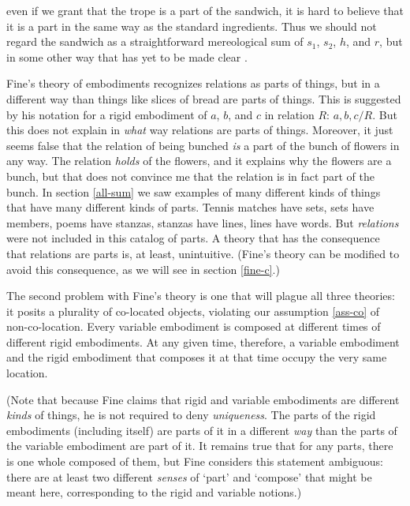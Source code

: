 \documentclass[11pt]{article}
\newenvironment{squote}{%
\begin{spacing}{1}
\begin{list}{}{%
\setlength{\labelwidth}{0pt}%
\rightmargin\leftmargin%
}
\item\relax
}{%
\end{list}%
\end{spacing}
}
\begin{document}
\begin{spacing}{1.5}
\begin{squote}
even if we grant that the trope is a part of the sandwich, it is hard
to believe that it is a part in the same way as the standard
ingredients.  Thus we should not regard the sandwich as a
straightforward mereological sum of $s_1$, $s_2$, $h$, and $r$, but in
some other way that has yet to be made clear \citep[64]{fine1999}.
\end{squote}

Fine's theory of embodiments recognizes relations as parts of things,
but in a different way than things like slices of bread are parts of
things.  This is suggested by his notation for a rigid embodiment of
$a$, $b$, and $c$ in relation $R$: $a, b, c / R$.  But this does not
explain in {\em what} way relations are parts of things.  Moreover, it
just seems false that the relation of being bunched {\em is} a part of
the bunch of flowers in any way.  The relation {\em holds} of the
flowers, and it explains why the flowers are a bunch, but that does
not convince me that the relation is in fact part of the bunch.  In
section \ref{all-sum} we saw examples of many different kinds of
things that have many different kinds of parts.  Tennis matches have
sets, sets have members, poems have stanzas, stanzas have lines, lines
have words.  But {\em relations} were not included in this catalog of
parts.  A theory that has the consequence that relations are parts is,
at least, unintuitive.  (Fine's theory can be modified to avoid this
consequence, as we will see in section \ref{fine-c}.)

The second problem with Fine's theory is one that will plague all
three theories: it posits a plurality of co-located objects, violating
our assumption \ref{ass-co} of non-co-location.  Every variable
embodiment is composed at different times of different rigid
embodiments.  At any given time, therefore, a variable embodiment and
the rigid embodiment that composes it at that time occupy the very
same location.

(Note that because Fine claims that rigid and variable embodiments are
different {\em kinds} of things, he is not required to deny {\em
  uniqueness}.  The parts of the rigid embodiments (including itself)
are parts of it in a different {\em way} than the parts of the
variable embodiment are part of it.  It remains true that for any
parts, there is one whole composed of them, but Fine considers this
statement ambiguous: there are at least two different {\em senses} of
`part' and `compose' that might be meant here, corresponding to the
rigid and variable notions.)


\end{spacing}
\end{document}
